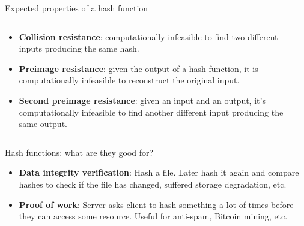 \documentclass[aspectratio=169, lualatex, handout]{beamer}
\begin{document}
\begin{frame}{Expected properties of a hash function}
	\begin{columns}[c]
		\begin{column}{0.6\textwidth}
			\begin{itemize}
				\item \textbf{Collision resistance}: computationally infeasible to find
				      two different inputs producing the same hash.
				\item \textbf{Preimage resistance}: given the output of a hash function,
				      it is computationally infeasible to reconstruct the original input.
				\item \textbf{Second preimage resistance}: given an input and an output,
				      it's computationally infeasible to find another different input
				      producing the same output.
			\end{itemize}
		\end{column}
		\begin{column}{0.4\textwidth}
		\end{column}
	\end{columns}
\end{frame}

\begin{frame}{Hash functions: what are they good for?}
	\begin{itemize}
		\item \textbf{Data integrity verification}: Hash a file. Later hash it
		      again and compare hashes to check if the file has changed, suffered storage
		      degradation, etc.
		\item \textbf{Proof of work}: Server asks client to hash something a lot of
		      times before they can access some resource. Useful for anti-spam, Bitcoin
		      mining, etc.
	\end{itemize}
\end{frame}
\end{document}
